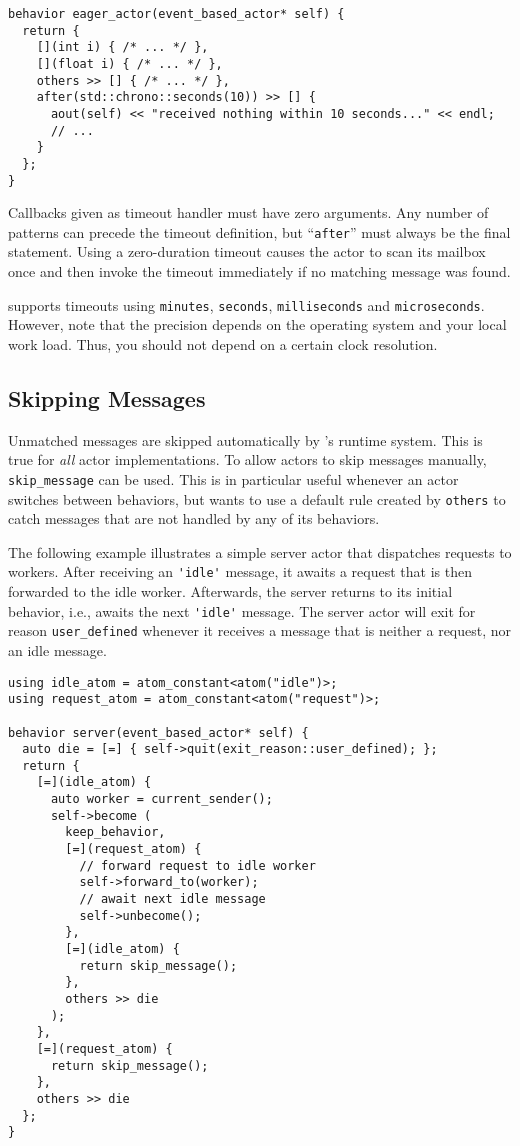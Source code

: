 \begin{lstlisting}
behavior eager_actor(event_based_actor* self) {
  return {
    [](int i) { /* ... */ },
    [](float i) { /* ... */ },
    others >> [] { /* ... */ },
    after(std::chrono::seconds(10)) >> [] {
      aout(self) << "received nothing within 10 seconds..." << endl;
      // ...
    }
  };
}
\end{lstlisting}

Callbacks given as timeout handler must have zero arguments.
Any number of patterns can precede the timeout definition, but  ``\lstinline^after^'' must always be the final statement.
Using a zero-duration timeout causes the actor to scan its mailbox once and then invoke the timeout immediately if no matching message was found.

\lib supports timeouts using \lstinline^minutes^, \lstinline^seconds^, \lstinline^milliseconds^ and \lstinline^microseconds^.
However, note that the precision depends on the operating system and your local work load.
Thus, you should not depend on a certain clock resolution.

\clearpage
\subsection{Skipping Messages}

Unmatched messages are skipped automatically by \lib's runtime system.
This is true for \textit{all} actor implementations.
To allow actors to skip messages manually, \lstinline^skip_message^ can be used.
This is in particular useful whenever an actor switches between behaviors, but wants to use a default rule created by \lstinline^others^ to catch messages that are not handled by any of its behaviors.

The following example illustrates a simple server actor that dispatches requests to workers.
After receiving an \lstinline^'idle'^ message, it awaits a request that is then forwarded to the idle worker.
Afterwards, the server returns to its initial behavior, i.e., awaits the next \lstinline^'idle'^ message.
The server actor will exit for reason \lstinline^user_defined^ whenever it receives a message that is neither a request, nor an idle message.

\begin{lstlisting}
using idle_atom = atom_constant<atom("idle")>;
using request_atom = atom_constant<atom("request")>;

behavior server(event_based_actor* self) {
  auto die = [=] { self->quit(exit_reason::user_defined); };
  return {
    [=](idle_atom) {
      auto worker = current_sender();
      self->become (
        keep_behavior,
        [=](request_atom) {
          // forward request to idle worker
          self->forward_to(worker);
          // await next idle message
          self->unbecome();
        },
        [=](idle_atom) {
          return skip_message();
        },
        others >> die
      );
    },
    [=](request_atom) {
      return skip_message();
    },
    others >> die
  };
}
\end{lstlisting}
